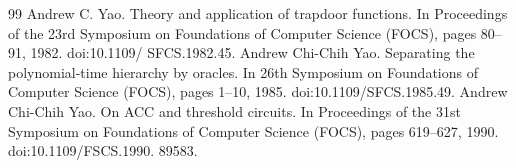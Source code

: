 \begin{thebibliography}{99}
 Andrew C. Yao. Theory and application of trapdoor functions. In Proceedings of the 23rd Symposium on Foundations of Computer Science (FOCS), pages 80–91, 1982. doi:10.1109/ SFCS.1982.45.
 Andrew Chi-Chih Yao. Separating the polynomial-time hierarchy by oracles. In 26th Symposium on Foundations of Computer Science (FOCS), pages 1–10, 1985. doi:10.1109/SFCS.1985.49.
 Andrew Chi-Chih Yao. On ACC and threshold circuits. In Proceedings of the 31st Symposium on Foundations of Computer Science (FOCS), pages 619–627, 1990. doi:10.1109/FSCS.1990. 89583.
\end{thebibliography}
